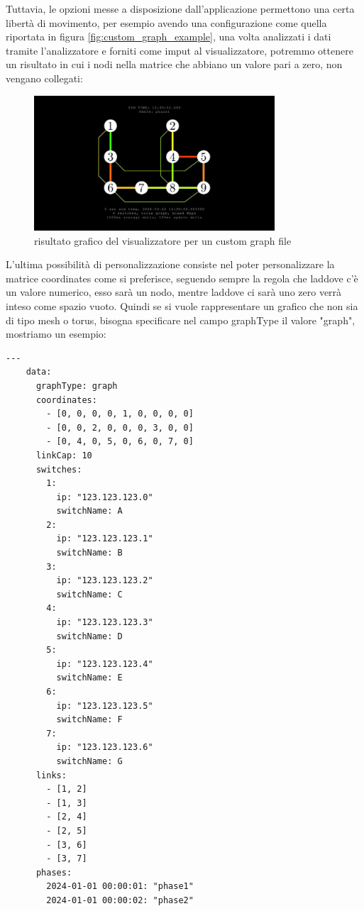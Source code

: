 \documentclass[binding=0.6cm]{sapthesis}
\begin{document}
Tuttavia, le opzioni messe a disposizione dall'applicazione permettono una certa libertà di movimento,
per esempio avendo una configurazione come quella riportata in figura \ref{fig:custom_graph_example},
una volta analizzati i dati tramite l'analizzatore e forniti come imput al visualizzatore, potremmo ottenere
un risultato in cui i nodi nella matrice che abbiano un valore pari a zero, non vengano
collegati:
\begin{figure}[h]
    \centering
    \includegraphics[width=0.8\textwidth]{immagini/only_links.JPG}
    \caption{risultato grafico del visualizzatore per un custom graph file}
    \label{fig:hybrid_custom_torus}
\end{figure}

L'ultima possibilità di personalizzazione consiste nel poter personalizzare la matrice coordinates come si preferisce, seguendo sempre la regola
che laddove c'è un valore numerico, esso sarà un nodo, mentre laddove ci sarà uno zero verrà inteso come spazio vuoto. Quindi se si vuole rappresentare
un grafico che non sia di tipo mesh o torus, bisogna specificare nel campo graphType il valore "graph", mostriamo un esempio:

{\scriptsize %
\begin{lstlisting}[caption={esempio di custom graph file, graphType posto al valore graph}]
    ---
    data:
      graphType: graph
      coordinates:
        - [0, 0, 0, 0, 1, 0, 0, 0, 0]
        - [0, 0, 2, 0, 0, 0, 3, 0, 0]
        - [0, 4, 0, 5, 0, 6, 0, 7, 0]
      linkCap: 10
      switches:
        1:
          ip: "123.123.123.0"
          switchName: A
        2:
          ip: "123.123.123.1"
          switchName: B
        3:
          ip: "123.123.123.2"
          switchName: C
        4:
          ip: "123.123.123.3"
          switchName: D
        5:
          ip: "123.123.123.4"
          switchName: E
        6:
          ip: "123.123.123.5"
          switchName: F
        7:
          ip: "123.123.123.6"
          switchName: G
      links:
        - [1, 2]
        - [1, 3]
        - [2, 4]
        - [2, 5]
        - [3, 6]
        - [3, 7]
      phases:
        2024-01-01 00:00:01: "phase1"
        2024-01-01 00:00:02: "phase2"
\end{lstlisting}
}
\end{document}
